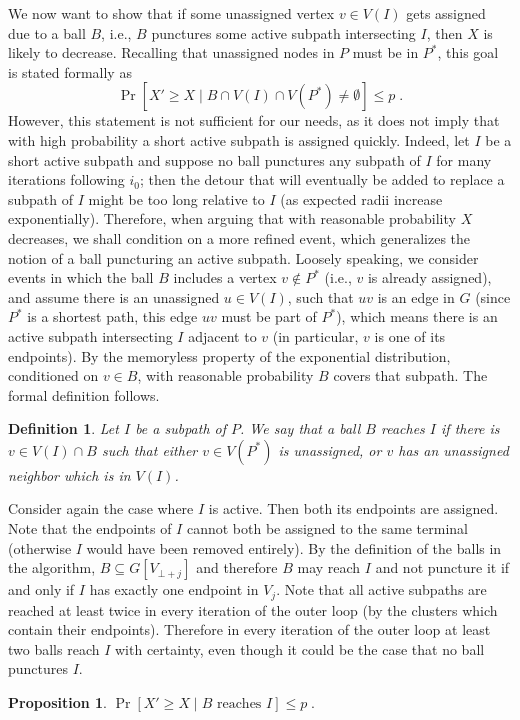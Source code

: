 \documentclass[twoside,leqno,twocolumn]{article}
\newtheorem{definition}[Definition]{Definition}
\newtheorem{definition}[theorem]{Definition}
\newtheorem{proposition}[theorem]{Proposition}
\begin{document}
We now want to show that if some unassigned vertex $v \in V(I)$ gets assigned due to a ball $B$, i.e., $B$ punctures some active subpath intersecting $I$, then $X$ is likely to decrease. 
Recalling that unassigned nodes in $P$ must be in $P^*$, 
this goal is stated formally as 
$$
  \Pr[X' \ge X \mid B \cap V(I) \cap V(P^*) \ne \emptyset] \le p \;.
$$ 
However, this statement is not sufficient for our needs, as it does not imply 
that with high probability a short active subpath is assigned quickly. 
Indeed, let $I$ be a short active subpath and suppose no ball punctures any subpath of $I$ for many iterations following $i_0$; 
then the detour that will eventually be added to replace a subpath of $I$
might be too long relative to $I$ (as expected radii increase exponentially). Therefore, when arguing that with reasonable probability $X$ decreases,
we shall condition on a more refined event, 
which generalizes the notion of a ball puncturing an active subpath.
Loosely speaking, we consider events in which the ball $B$ includes 
a vertex $v \notin P^*$ (i.e., $v$ is already assigned),
and assume there is an unassigned $u \in V(I)$, such that $uv$ is an edge in $G$ (since $P^*$ is a shortest path, this edge $uv$ must be part of $P^*$),
which means there is an active subpath intersecting $I$ adjacent to $v$
(in particular, $v$ is one of its endpoints). 
By the memoryless property of the exponential distribution, conditioned on $v \in B$, with reasonable probability $B$ covers that subpath. 
The formal definition follows.

\begin{definition}
Let $I$ be a subpath of $P$. We say that a ball $B$ {\em reaches} $I$ if there is $v \in V(I) \cap B$ such that either $v \in V(P^*)$ is unassigned, 
or $v$ has an unassigned neighbor which is in $V(I)$.
\end{definition}

Consider again the case where $I$ is active. Then both its endpoints are assigned. Note that the endpoints of $I$ cannot both be assigned to the same terminal (otherwise $I$ would have been removed entirely). 
By the definition of the balls in the algorithm, $B \subseteq G[V_{\bot+j}]$ and therefore $B$ may reach $I$ and not puncture it if and only if $I$ has exactly one endpoint in $V_j$. Note that all active subpaths are reached at least twice in every iteration of the outer loop (by the clusters which contain their endpoints). Therefore in every iteration of the outer loop at least two balls reach $I$ with certainty, even though it could be the case that no ball punctures $I$. 
\begin{proposition} \label{p:cond}
$\Pr[X' \ge X \mid \text{$B$ reaches $I$}] \le p \;.$
\end{proposition} 
\end{document}
